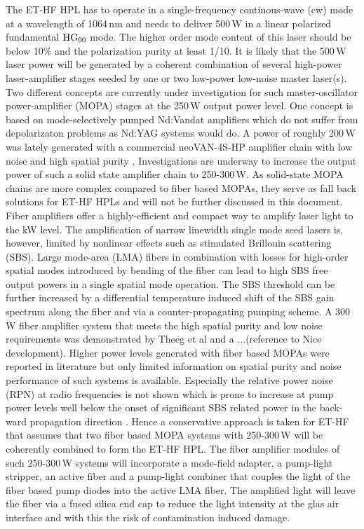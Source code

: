 The ET-HF HPL has to operate in a single-frequency continous-wave (cw) mode at a wavelength of 1064\,nm and needs to deliver 500\,W in a linear polarized fundamental $\rm HG_{00}$ mode. The higher order mode content of this laser should be below 10\% and the polarization purity at least 1/10. It is likely that the 500\,W laser power will be generated by a coherent combination of several high-power laser-amplifier stages seeded by one or two low-power low-noise master laser(s). Two different concepts are currently under investigation for such master-oscillator power-amplifier (MOPA) stages at the 250\,W output power level. One concept is based on mode-selectively pumped Nd:Vandat amplifiers which do not suffer from depolarizaton problems as Nd:YAG systems would do. A power of roughly 200\,W was lately generated with a commercial neoVAN-4S-HP amplifier chain with low noise and high spatial purity \cite{Bode2020}. Investigations are underway to increase the output power of such a solid state amplifier chain to 250-300\,W. As solid-state MOPA chains are more complex compared to fiber based MOPAs, they serve as fall back solutions for ET-HF HPLs and will not be further discussed in this document.
\\
Fiber amplifiers offer a highly-efficient and compact way to amplify laser light to the kW level. The amplification of narrow linewidth single mode seed lasers is, however, limited by nonlinear effects such as stimulated Brillouin scattering (SBS). Large mode-area (LMA) fibers in combination with losses for high-order spatial modes introduced by bending of the fiber can lead to high SBS free output powers in a single spatial mode operation. The SBS threshold can be further increased by a differential temperature induced shift of the SBS gain spectrum along the fiber and via a counter-propagating pumping scheme. A 300\,W fiber amplifier system that meets the high spatial purity and low noise requirements was demonstrated by Theeg et al \cite{Theeg} and a ...(reference to Nice development). Higher power levels generated with fiber based MOPAs were reported in literature but only limited information on spatial purity and noise performance of such systems is available. Especially the relative power noise (RPN) at radio frequencies is not shown which is prone to increase at pump power levels well below the onset of significant SBS related power in the back-ward propagation direction \cite{LZH}. Hence a conservative approach is taken for ET-HF that assumes that two fiber based MOPA systems with 250-300\,W will be coherently combined to form the ET-HF HPL. 
The fiber amplifier modules of such 250-300\,W systems will incorporate a mode-field adapter, a pump-light stripper, an active fiber and a pump-light combiner that couples the light of the fiber based pump diodes into the active LMA fiber. The amplified light will leave the fiber via a fused silica end cap to reduce the light intensity at the glas air interface and with this the risk of contamination induced damage.

